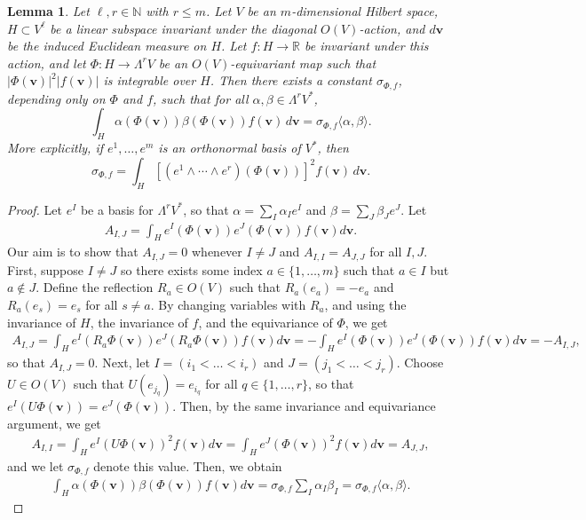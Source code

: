 \documentclass[11pt,reqno]{amsproc}
\numberwithin{equation}{section}
\newcommand{\N}{\mathbb{N}}
\newcommand{\bv}{\mathbf{v}}
\newtheorem{lemma}[counter]{Lemma}
\theoremstyle{definition}
\theoremstyle{plain}
\begin{document}
    \begin{lemma} \label{lem:bilinear_form_trace}
    Let $\ell,r \in \N$ with $r \leq m$. Let \(V\) be an \(m\)-dimensional Hilbert space,
    \(H\subset V^\ell\) be a linear subspace invariant under the diagonal
    \(O(V)\)-action, and $d\bv$ be the induced Euclidean measure on $H$. Let \(f:H\to\mathbb R\) be invariant under this action, and let $\Phi:H\to \Lambda^r V$
    be an \(O(V)\)-equivariant map such that $|\Phi(\bv)|^2 |f(\bv)|$ is integrable over $H$. Then there exists a constant
    \(\sigma_{\Phi,f}\), depending only on \(\Phi\) and \(f\), such that for all
    \(\alpha,\beta\in \Lambda^r V^*\),
    \[
    \int_H \alpha(\Phi(\bv))\beta(\Phi(\bv))f(\bv)\,d\bv
    =
    \sigma_{\Phi,f}\langle \alpha,\beta\rangle.
    \]
    More explicitly, if \(e^1,\ldots,e^m\) is an orthonormal basis of $V^*$, then
    \[
    \sigma_{\Phi,f}
    =
    \int_H
    \left[
    (e^1\wedge\cdots\wedge e^r)(\Phi(\bv))
    \right]^2
    f(\bv)\,d\bv .
    \]
    \end{lemma}
    \begin{proof}
        Let $e^I$ be a basis for $\Lambda^r V^*$, so that $\alpha = \sum_{I} \alpha_I e^I$ and $\beta = \sum_J \beta_J e^J$.
        Let
        \begin{align}
            A_{I,J} = \int_{H} e^I(\Phi(\bv)) e^J(\Phi(\bv)) f(\bv) d\bv.
        \end{align}
        Our aim is to show that $A_{I,J} = 0$ whenever $I \neq J$ and $A_{I,I} = A_{J,J}$ for all $I, J$. First, suppose $I \neq J$ so there exists some index $a \in \{1,\ldots,m\}$ such that $a \in I$ but $a \notin J$. Define the reflection $R_a \in O(V)$ such that $R_a(e_a) = -e_a$ and $R_a(e_s) = e_s$ for all $s \neq a$. By changing variables with $R_a$, and using the invariance of $H$, the invariance of $f$, and the equivariance of $\Phi$, we get
        \begin{align}
            A_{I,J} = \int_{H} e^I(R_a \Phi(\bv)) e^J(R_a \Phi(\bv)) f(\bv) d\bv = - \int_{H} e^I(\Phi(\bv)) e^J(\Phi(\bv)) f(\bv) d \bv = -A_{I,J},
        \end{align}
        so that $A_{I,J} = 0$. Next, let $I = (i_1 < \ldots < i_r)$ and $J = (j_1 < \ldots < j_r)$. Choose $U \in O(V)$ such that $U(e_{j_q}) = e_{i_q}$ for all $q \in \{1,\ldots,r\}$, so that $e^I(U\Phi(\bv)) = e^J(\Phi(\bv))$. Then, by the same invariance and equivariance argument, we get
        \begin{align}
            A_{I,I} = \int_{H} e^I(U\Phi(\bv))^2 f(\bv) d\bv = \int_{H} e^J(\Phi(\bv))^2 f(\bv) d\bv = A_{J,J},
        \end{align}
        and we let $\sigma_{\Phi,f}$ denote this value. Then, we obtain 
        \begin{align}
            \int_{H} \alpha(\Phi(\bv))\beta(\Phi(\bv)) f(\bv) d\bv = \sigma_{\Phi,f} \sum_{I} \alpha_I \beta_I = \sigma_{\Phi,f} \langle \alpha, \beta \rangle.
        \end{align}
    \end{proof}
    
\end{document}
